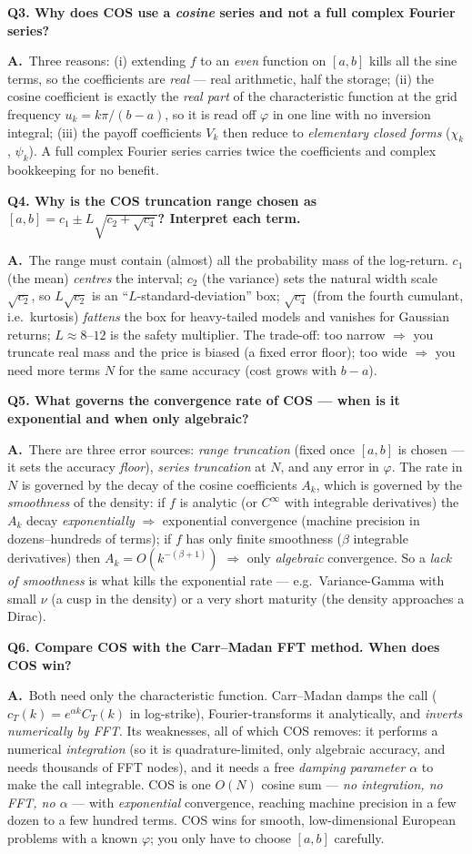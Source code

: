 \documentclass[11pt]{article}
\newcommand{\ch}{\varphi}
\newcommand{\Qq}[1]{\bigskip\noindent\textbf{\large #1}\par\nobreak\smallskip}
\newcommand{\A}{\noindent\textbf{A.}\ }
\begin{document}
\Qq{Q3. Why does COS use a \emph{cosine} series and not a full complex Fourier series?}
\A Three reasons: (i) extending $f$ to an \emph{even} function on $[a,b]$ kills all the sine terms, so the
coefficients are \emph{real} --- real arithmetic, half the storage; (ii) the cosine coefficient is exactly the
\emph{real part} of the characteristic function at the grid frequency $u_k=k\pi/(b-a)$, so it is read off $\ch$
in one line with no inversion integral; (iii) the payoff coefficients $V_k$ then reduce to \emph{elementary
closed forms} ($\chi_k$, $\psi_k$). A full complex Fourier series carries twice the coefficients and complex
bookkeeping for no benefit.

\Qq{Q4. Why is the COS truncation range chosen as $[a,b]=c_1\pm L\sqrt{c_2+\sqrt{c_4}}$? Interpret each term.}
\A The range must contain (almost) all the probability mass of the log-return. $c_1$ (the mean) \emph{centres}
the interval; $c_2$ (the variance) sets the natural width scale $\sqrt{c_2}$, so $L\sqrt{c_2}$ is an
``$L$-standard-deviation'' box; $\sqrt{c_4}$ (from the fourth cumulant, i.e.\ kurtosis) \emph{fattens} the box
for heavy-tailed models and vanishes for Gaussian returns; $L\approx 8\text{--}12$ is the safety multiplier.
The trade-off: too narrow $\Rightarrow$ you truncate real mass and the price is biased (a fixed error floor);
too wide $\Rightarrow$ you need more terms $N$ for the same accuracy (cost grows with $b-a$).

\Qq{Q5. What governs the convergence rate of COS --- when is it exponential and when only algebraic?}
\A There are three error sources: \emph{range truncation} (fixed once $[a,b]$ is chosen --- it sets the accuracy
\emph{floor}), \emph{series truncation} at $N$, and any error in $\ch$. The rate in $N$ is governed by the decay
of the cosine coefficients $A_k$, which is governed by the \emph{smoothness} of the density: if $f$ is analytic
(or $C^\infty$ with integrable derivatives) the $A_k$ decay \emph{exponentially} $\Rightarrow$ exponential
convergence (machine precision in dozens–hundreds of terms); if $f$ has only finite smoothness ($\beta$
integrable derivatives) then $A_k=O(k^{-(\beta+1)})$ $\Rightarrow$ only \emph{algebraic} convergence. So a
\emph{lack of smoothness} is what kills the exponential rate --- e.g.\ Variance-Gamma with small $\nu$ (a cusp
in the density) or a very short maturity (the density approaches a Dirac).

\Qq{Q6. Compare COS with the Carr--Madan FFT method. When does COS win?}
\A Both need only the characteristic function. Carr--Madan damps the call ($c_T(k)=e^{\alpha k}C_T(k)$ in
log-strike), Fourier-transforms it analytically, and \emph{inverts numerically by FFT}. Its weaknesses, all of
which COS removes: it performs a numerical \emph{integration} (so it is quadrature-limited, only algebraic
accuracy, and needs thousands of FFT nodes), and it needs a free \emph{damping parameter} $\alpha$ to make the
call integrable. COS is one $O(N)$ cosine sum --- \emph{no integration, no FFT, no $\alpha$} --- with
\emph{exponential} convergence, reaching machine precision in a few dozen to a few hundred terms. COS wins for
smooth, low-dimensional European problems with a known $\ch$; you only have to choose $[a,b]$ carefully.
\end{document}
